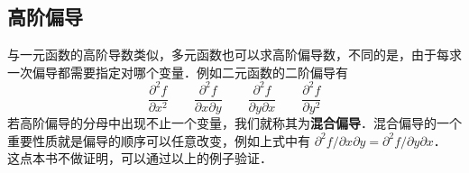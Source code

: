 \subsection{高阶偏导}
与一元函数的高阶导数类似，多元函数也可以求高阶偏导数，不同的是，由于每求一次偏导都需要指定对哪个变量．例如二元函数的二阶偏导有
\begin{equation}
\frac{{{\partial ^2}f}}{{\partial {x^2}}} \qquad
\frac{{{\partial ^2}f}}{{\partial x\partial y}} \qquad
\frac{{{\partial ^2}f}}{{\partial y\partial x}} \qquad
\frac{{{\partial ^2}f}}{{\partial {y^2}}}
\end{equation}
若高阶偏导的分母中出现不止一个变量，我们就称其为\textbf{混合偏导}．混合偏导的一个重要性质就是偏导的顺序可以任意改变，例如上式中有 ${\partial ^2}f/\partial x\partial y = {\partial ^2}f/\partial y\partial x$． 这点本书不做证明，可以通过以上的例子验证．








